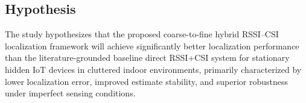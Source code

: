 \subsection*{Hypothesis}

The study hypothesizes that the proposed coarse-to-fine hybrid RSSI--CSI localization framework will achieve significantly better localization performance than the literature-grounded baseline direct RSSI+CSI system for stationary hidden IoT devices in cluttered indoor environments, primarily characterized by lower localization error, improved estimate stability, and superior robustness under imperfect sensing conditions.

\nocite{ju2025hidden,li2024efficient,yang2021survey,yang2013rssi2csi,wu2012csi,zaruba2007singleap,sensors2022indoor3d,xie2015urbancanyon,leitch2023indoor,suroso2023csi,mottakin2024swiloc,reyes2025temporal}